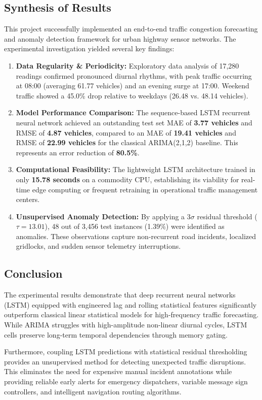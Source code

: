 \documentclass[12pt,a4paper]{article}
\begin{document}
\subsection{Synthesis of Results}
This project successfully implemented an end-to-end traffic congestion forecasting and anomaly detection framework for urban highway sensor networks. The experimental investigation yielded several key findings:
\begin{enumerate}
    \item \textbf{Data Regularity \& Periodicity:} Exploratory data analysis of 17,280 readings confirmed pronounced diurnal rhythms, with peak traffic occurring at 08:00 (averaging 61.77 vehicles) and an evening surge at 17:00. Weekend traffic showed a 45.0\% drop relative to weekdays (26.48 vs. 48.14 vehicles).
    \item \textbf{Model Performance Comparison:} The sequence-based LSTM recurrent neural network achieved an outstanding test set MAE of \textbf{3.77 vehicles} and RMSE of \textbf{4.87 vehicles}, compared to an MAE of \textbf{19.41 vehicles} and RMSE of \textbf{22.99 vehicles} for the classical ARIMA(2,1,2) baseline. This represents an error reduction of \textbf{80.5\%}.
    \item \textbf{Computational Feasibility:} The lightweight LSTM architecture trained in only \textbf{15.78 seconds} on a commodity CPU, establishing its viability for real-time edge computing or frequent retraining in operational traffic management centers.
    \item \textbf{Unsupervised Anomaly Detection:} By applying a $3\sigma$ residual threshold ($\tau = 13.01$), 48 out of 3,456 test instances (1.39\%) were identified as anomalies. These observations capture non-recurrent road incidents, localized gridlocks, and sudden sensor telemetry interruptions.
\end{enumerate}

\subsection{Conclusion}
The experimental results demonstrate that deep recurrent neural networks (LSTM) equipped with engineered lag and rolling statistical features significantly outperform classical linear statistical models for high-frequency traffic forecasting. While ARIMA struggles with high-amplitude non-linear diurnal cycles, LSTM cells preserve long-term temporal dependencies through memory gating.

Furthermore, coupling LSTM predictions with statistical residual thresholding provides an unsupervised method for detecting unexpected traffic disruptions. This eliminates the need for expensive manual incident annotations while providing reliable early alerts for emergency dispatchers, variable message sign controllers, and intelligent navigation routing algorithms.
\end{document}
